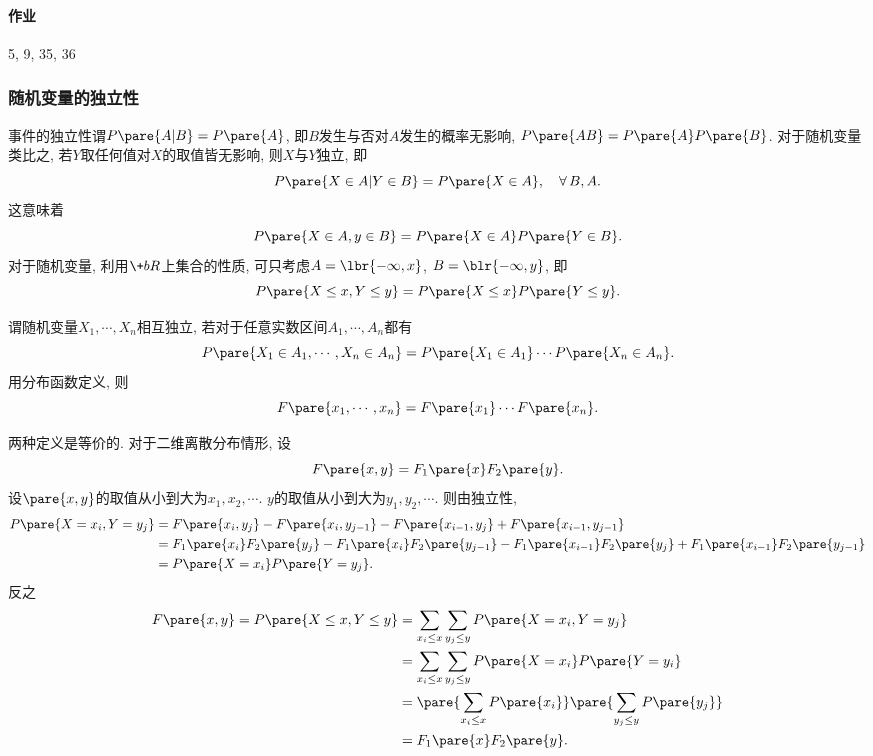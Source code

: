 \documentclass[../Statistics.tex]{subfiles}
\begin{document}

\paragraph{作业} %
\label{par:作业}

5, 9, 35, 36



\subsubsection{随机变量的独立性} %
\label{ssub:随机变量的独立性}

事件的独立性谓$P\pare{A\vert B} = P\pare{A}$, 即$B$发生与否对$A$发生的概率无影响, $P\pare{AB} = P\pare{A}P\pare{B}$. 对于随机变量类比之, 若$Y$取任何值对$X$的取值皆无影响, 则$X$与$Y$独立, 即
\[ P\pare{X\in A\vert Y\in B} = P\pare{X\in A},\quad \forall\, B,A. \]
这意味着
\[ P\pare{X\in A,y\in B} = P\pare{X\in A}P\pare{Y\in B}. \]
对于随机变量, 利用$\+bR$上集合的性质, 可只考虑$A = \lbr{-\infty,x}$, $B = \blr{-\infty,y}$, 即
\[ P\pare{X\le x, Y\le y} = P\pare{X\le x}P\pare{Y\le y}. \]
\begin{definition}[随机变量相互独立]
    谓随机变量$X_1,\cdots, X_n$相互独立, 若对于任意实数区间$A_1,\cdots, A_n$都有
    \[ P\pare{X_1 \in A_1,\cdots, X_n \in A_n} = P\pare{X_1\in A_1} \cdots P\pare{X_n \in A_n}. \]
    用分布函数定义, 则
    \[ F\pare{x_1,\cdots,x_n} = F\pare{x_1}\cdots F\pare{x_n}. \]
\end{definition}
两种定义是等价的. 对于二维离散分布情形, 设
\[ F\pare{x,y} = F_1\pare{x}F_2\pare{y}. \]
设$\pare{x,y}$的取值从小到大为$x_1,x_2,\cdots$. $y$的取值从小到大为$y_1,y_2,\cdots$. 则由独立性,
\begin{align*}
    P\pare{X=x_i,Y=y_j} &= F\pare{x_i,y_j} - F\pare{x_i,y_{j-1}} - F\pare{x_{i-1},y_j} + F\pare{x_{i-1},y_{j-1}} \\
    &= F_1\pare{x_i} F_2\pare{y_j} - F_1\pare{x_i}F_2\pare{y_{j-1}} - F_1\pare{x_{i-1}} F_2\pare{y_j} + F_1\pare{x_{i-1}}F_2\pare{y_{j-1}} \\
    &= P\pare{X=x_i}P\pare{Y=y_j}.
\end{align*}
反之
\begin{align*}
    F\pare{x,y} = P\pare{X\le x,Y\le y} &= \sum_{x_i \le x}\sum_{y_j\le y} P\pare{X=x_i,Y=y_j} \\
    &= \sum_{x_i\le x}\sum_{y_j\le y} P\pare{X=x_i}P\pare{Y=y_i} \\
    &= \pare{\sum_{x_i \le x}P\pare{x_i}} \pare{\sum_{y_j\le y}P\pare{y_j}} \\
    &= F_1\pare{x}F_2\pare{y}.
\end{align*}
\end{document}
